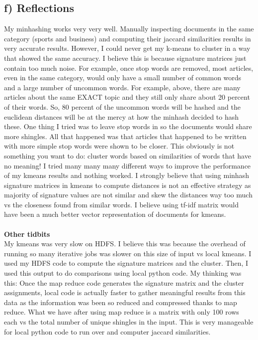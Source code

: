 \subsection*{f) Reflections}
My minhashing works very very well. Manually inspecting documents in the same category (sports and business) and computing their jaccard similarities results in very accurate results. However, I could never get my k-means to cluster in a way that showed the same accuracy. I believe this is because signature matrices just contain too much noise. For example, once stop words are removed, most articles, even in the same category, would only have a small number of common words and a large number of uncommon words. For example, above, there are many articles about the same EXACT topic and they still only share about 20 percent of their words. So, 80 percent of the uncommon words will be hashed and the euclidean distances will be at the mercy at how the minhash decided to hash these. One thing I tried was to leave stop words in so the documents would share more shingles. All that happened was that articles that happened to be written with more simple stop words were shown to be closer. This obviously is not something you want to do: cluster words based on similarities of words that have no meaning! I tried many many many different ways to improve the performance of my kmeans results and nothing worked. I strongly believe that using minhash signature matrices in kmeans to compute distances is not an effective strategy as majority of signature values are not similar and skew the distances way too much vs the closeness found from similar words. I believe using tf-idf matrix would have been a much better vector representation of documents for kmeans. 
\\
\\
\textbf{Other tidbits}
\\
My kmeans was very slow on HDFS. I believe this was because the overhead of running so many iterative jobs was slower on this size of input vs local kmeans. I used my HDFS code to compute the signature matrices and the cluster. Then, I used this output to do comparisons using local python code. My thinking was this: Once the map reduce code generates the signature matrix and the cluster assignments, local code is actually faster to gather meaningful results from this data as the information was been so reduced and compressed thanks to map reduce. What we have after using map reduce is a matrix with only 100 rows each vs the total number of unique shingles in the input. This is very manageable for local python code to run over and computer jaccard similarities. 

